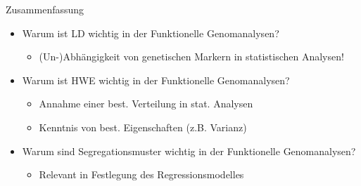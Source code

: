 \documentclass{beamer}
\begin{document}
\begin{frame}{Zusammenfassung}

\begin{itemize}
    \item Warum ist LD wichtig in der Funktionelle Genomanalysen?
    \begin{itemize}
        \item (Un-)Abhängigkeit von genetischen Markern in statistischen Analysen!
    \end{itemize}
    \item Warum ist HWE wichtig in der Funktionelle Genomanalysen?
    \begin{itemize}
        \item Annahme einer best. Verteilung in stat. Analysen
        \item Kenntnis von best. Eigenschaften (z.B. Varianz)
    \end{itemize}
    \item Warum sind Segregationsmuster wichtig in der Funktionelle Genomanalysen?
    \begin{itemize}
        \item Relevant in Festlegung des Regressionsmodelles
    \end{itemize}
\end{itemize}
    
\end{frame}
\end{document}
